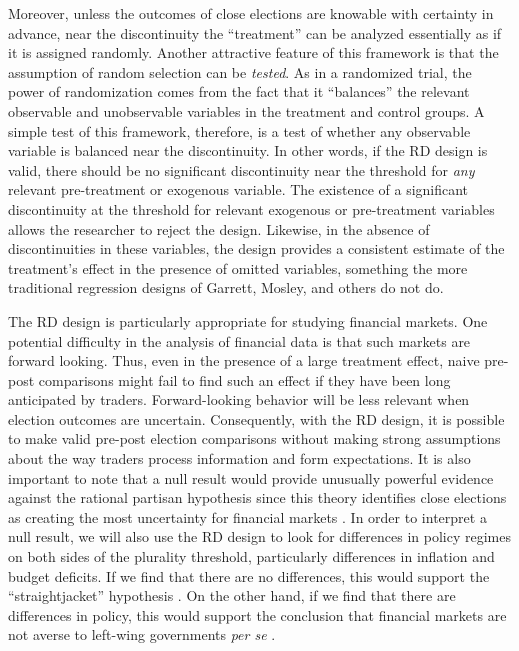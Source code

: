 \documentclass[12pt]{article}
\begin{document}
Moreover, unless the outcomes of close elections are knowable with certainty in advance, near the discontinuity the ``treatment'' can be analyzed essentially as if it is assigned randomly. Another attractive feature of this framework is that the assumption of random selection can be \textit{tested}. As in a randomized trial, the power of randomization comes from the fact that it ``balances'' the relevant observable and unobservable variables in the treatment and control groups. A simple test of this framework, therefore, is a test of whether any observable variable is balanced near the discontinuity. In other words, if the RD design is valid, there should be no significant discontinuity near the threshold for \textit{any} relevant pre-treatment or exogenous variable. The existence of a significant discontinuity at the threshold for relevant exogenous or pre-treatment variables allows the researcher to reject the design. Likewise, in the absence of discontinuities in these variables, the design provides a consistent estimate of the treatment's effect in the presence of omitted variables, something the more traditional regression designs of Garrett, Mosley, and others do not do. 

The RD design is particularly appropriate for studying financial markets. One potential difficulty in the analysis of financial data is that such markets are forward looking. Thus, even in the presence of a large treatment effect, naive pre-post comparisons might fail to find such an effect if they have been long anticipated by traders. Forward-looking behavior will be less relevant when election outcomes are uncertain. Consequently, with the RD design, it is possible to make valid pre-post election comparisons without making strong assumptions about the way traders process information and form expectations. It is also important to note that a null result would provide unusually powerful evidence against the rational partisan hypothesis since this theory identifies close elections as creating the most uncertainty for financial markets \citep{Alesina1997, Bachman1992}. In order to interpret a null result, we will also use the RD design to look for differences in policy regimes on both sides of the plurality threshold, particularly differences in inflation and budget deficits. If we find that there are no differences, this would support the ``straightjacket'' hypothesis \citep{Rodrik2000}. On the other hand, if we find that there are differences in policy, this would support the conclusion that financial markets are not averse to left-wing governments \textit{per se} \citep{Garrett1998, Mosley2000}.
\end{document}
